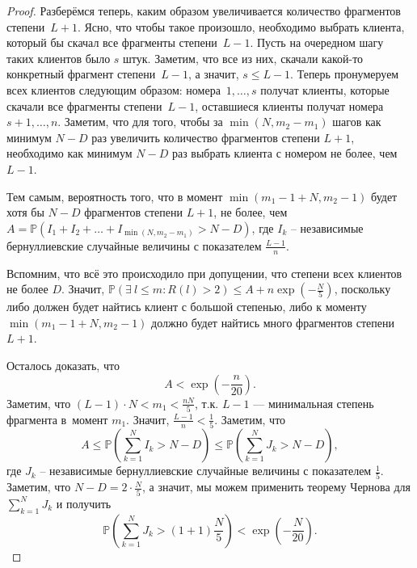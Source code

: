 \documentclass{matmex-diploma-custom}
\newcommand{\PRob}{\mathbb P}
\newcommand{\leqs}{\leqslant}
\theoremstyle{named}
\begin{document}
\begin{proof}
Разберёмся теперь, каким образом увеличивается количество фрагментов степени~$L+1$. 
Ясно, что чтобы такое произошло, необходимо выбрать клиента, который бы скачал все фрагменты степени~$L-1$. 
Пусть на очередном шагу таких клиентов было $s$ штук. Заметим, что все из них, скачали какой-то конкретный фрагмент степени~$L-1$, 
а значит, $s \leqs L-1$. Теперь пронумеруем всех клиентов следующим образом: номера~$1, \dots, s$ получат клиенты, 
которые скачали все фрагменты степени~$L-1$, оставшиеся клиенты получат номера~$s +1, \dots, n$.
Заметим, что для того, чтобы за $\min(N, m_2 - m_1)$ шагов как минимум $N-D$ раз увеличить количество фрагментов степени $L+1$,
необходимо как минимум $N-D$ раз выбрать клиента с номером не более, чем $L-1$.

Тем самым, вероятность того, что в момент $\min(m_1 - 1 + N, m_2 - 1)$ будет хотя бы $N-D$ фрагментов степени $L+1$, 
не более, чем $ A = \PRob(I_1 + I_2 + \dots + I_{\min(N, m_2 - m_1)} > N - D)$, 
где $I_k$ -- независимые бернуллиевские случайные величины с показателем $\frac{L-1}{n}$.

Вспомним, что всё это происходило при допущении, что степени всех клиентов не более $D$. 
Значит, $\PRob\left(\exists~ l \leqs m : R(l) > 2 \right) \leqs A +  n\exp\left(-\frac{N}{5}\right)$, 
поскольку либо должен будет найтись клиент с большой степенью, 
либо к моменту $\min(m_1 - 1 + N, m_2 - 1)$ должно будет найтись много фрагментов степени $L+1$.

Осталось доказать, что 
\begin{equation}
A < \exp\left(- \frac{n}{20}\right).
\end{equation}
Заметим, что $(L-1)\cdot N < m_1 < \frac{nN}{5}$, т.к. $L-1$ --- минимальная степень фрагмента в~момент $m_1$.
Значит, $\frac{L-1}{n} < \frac{1}{5}$. Заметим, что
\begin{equation}
A \leqs \PRob\left(\sum_{k = 1}^N I_k > N - D\right) \leqs \PRob\left(\sum_{k = 1}^N J_k > N - D\right),
\end{equation}
где $J_k$ -- независимые бернуллиевские случайные величины с показателем $\frac{1}{5}$. 
Заметим, что $N - D = 2\cdot \frac{N}{5}$, а значит, мы можем применить 
теорему Чернова для $\sum\limits_{k = 1}^N J_k$ и получить
\begin{equation}
\PRob\left(\sum_{k = 1}^N J_k > (1 + 1) \frac{N}{5}\right) < \exp\left( - \frac{N}{20}\right).
\end{equation}
\end{proof}
\end{document}
